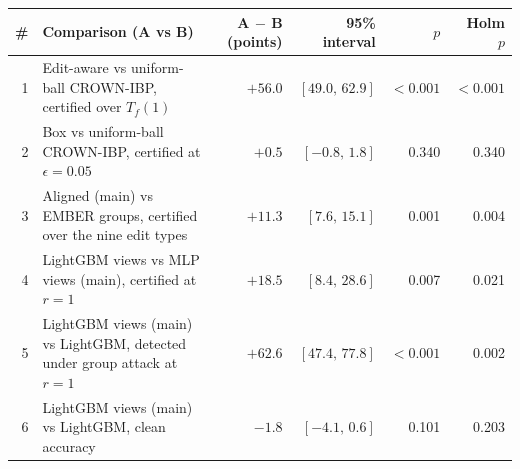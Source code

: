 \begin{tabular}{rlrrrr}
\toprule
\# & Comparison (A vs B) & A $-$ B (points) & 95\% interval & $p$ & Holm $p$ \\
\midrule
1 & Edit-aware vs uniform-ball CROWN-IBP, certified over $T_f(1)$ & $+56.0$ & $[49.0,\,62.9]$ & $<0.001$ & $<0.001$ \\
2 & Box vs uniform-ball CROWN-IBP, certified at $\epsilon=0.05$ & $+0.5$ & $[-0.8,\,1.8]$ & 0.340 & 0.340 \\
3 & Aligned (main) vs EMBER groups, certified over the nine edit types & $+11.3$ & $[7.6,\,15.1]$ & 0.001 & 0.004 \\
4 & LightGBM views vs MLP views (main), certified at $r=1$ & $+18.5$ & $[8.4,\,28.6]$ & 0.007 & 0.021 \\
5 & LightGBM views (main) vs LightGBM, detected under group attack at $r=1$ & $+62.6$ & $[47.4,\,77.8]$ & $<0.001$ & 0.002 \\
6 & LightGBM views (main) vs LightGBM, clean accuracy & $-1.8$ & $[-4.1,\,0.6]$ & 0.101 & 0.203 \\
\bottomrule
\end{tabular}
